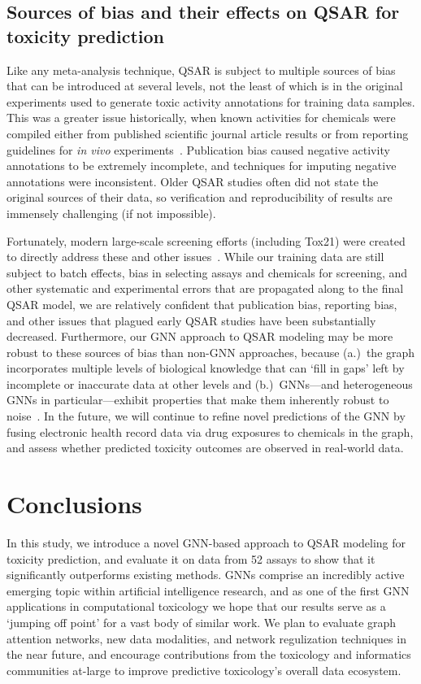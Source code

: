 \documentclass{ws-procs11x85}
\begin{document}
\subsection{Sources of bias and their effects on QSAR for toxicity prediction}
Like any meta-analysis technique, QSAR is subject to multiple sources of bias that can be introduced at several levels, not the least of which is in the original experiments used to generate toxic activity annotations for training data samples.
This was a greater issue historically, when known activities for chemicals were compiled either from published scientific journal article results or from reporting guidelines for \textit{in vivo} experiments~\cite{cronin2019identification}.
Publication bias caused negative activity annotations to be extremely incomplete, and techniques for imputing negative annotations were inconsistent.
Older QSAR studies often did not state the original sources of their data, so verification and reproducibility of results are immensely challenging (if not impossible).

Fortunately, modern large-scale screening efforts (including Tox21) were created to directly address these and other issues~\cite{shoichet2004virtual}.
While our training data are still subject to batch effects, bias in selecting assays and chemicals for screening, and other systematic and experimental errors that are propagated along to the final QSAR model, we are relatively confident that publication bias, reporting bias, and other issues that plagued early QSAR studies have been substantially decreased. Furthermore, our GNN approach to QSAR modeling may be more robust to these sources of bias than non-GNN approaches, because (a.)~the graph incorporates multiple levels of biological knowledge that can `fill in gaps' left by incomplete or inaccurate data at other levels and (b.)~GNNs---and heterogeneous GNNs in particular---exhibit properties that make them inherently robust to noise~\cite{xie2020heterogeneous,nt2019revisiting}.
In the future, we will continue to refine novel predictions of the GNN by fusing electronic health record data via drug exposures to chemicals in the graph, and assess whether predicted toxicity outcomes are observed in real-world data.
\section{Conclusions}
In this study, we introduce a novel GNN-based approach to QSAR modeling for toxicity prediction, and evaluate it on data from 52 assays to show that it significantly outperforms existing methods.
GNNs comprise an incredibly active emerging topic within artificial intelligence research, and as one of the first GNN applications in computational toxicology we hope that our results serve as a `jumping off point' for a vast body of similar work.
We plan to evaluate graph attention networks, new data modalities, and network regulization techniques in the near future, and encourage contributions from the toxicology and informatics communities at-large to improve predictive toxicology's overall data ecosystem.
\end{document}

